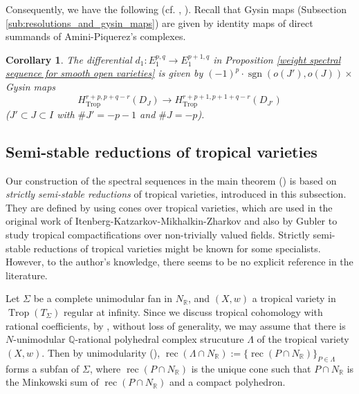 \documentclass[12pt,a4]{amsart}
\newtheorem{cor}[thm]{Corollary}
\def\R{\mathbb{R}}
\def\Q{\mathbb{Q}}
\def\rec{\mathop{\mathrm{rec}}\nolimits}
\def\sgn{\mathop{\mathrm{sgn}}\nolimits}
\def\Trop{\mathop{\mathrm{trop}}\nolimits}
\def\Trop{\mathop{\mathrm{Trop}}\nolimits}
\numberwithin{equation}{section}
\numberwithin{figure}{section}
\begin{document}
     Consequently, we have the following (cf. 
      \cite[Proposition 1.8]{GuillenNavarroSurlethormelocaldescyclesinvariantsAznar1990},  
   \cite[Proposition 4.7 and 4.10]{PetersSteenbrinkMixedHodgestructures2008}).
   Recall that 
   Gysin maps 
   (Subsection \ref{sub:resolutions_and_gysin_maps})
   are given by identity maps of direct summands of Amini-Piquerez's complexes.

  \begin{cor}\label{sign of log spectral sequence:label}
   The differential 
   $d_1 \colon E_1^{p,q} \to E_1^{p+1,q}$
   in Proposition \ref{weight spectral sequence for smooth open varieties}
   is given by   $  (-1)^{p} \cdot  \sgn (o(J'), o(J)) \times $ Gysin maps
    $$  H^{r+p, p+q -r}_{\Trop} ( D_J ) 
          \to 
          H^{r+p+1, p+1+q -r }_{\Trop} ( D_{J'} ) $$
    ($J' \subset J \subset I $ 
       with $ \# J'= -p-1$ and $ \# J= -p$). 
  \end{cor}



 \subsection{Semi-stable reductions of tropical varieties}
  \label{sub:semi_stable_reductions_of_tropical_varieties}
  Our construction of the spectral sequences in the main theorem ()
  is based on \emph{strictly semi-stable reductions} of tropical varieties, introduced in this subsection. 
   They are defined by using cones over tropical varieties, 
   which are used 
   in the original work of  Itenberg-Katzarkov-Mikhalkin-Zharkov \cite{ItenbergKatzarkovMikhalkinZharkovTropicalhomology2019} 
   and also by Gubler to study
     tropical compactifications over non-trivially valued fields.
  Strictly semi-stable reductions of tropical varieties might be known for some specialists.
    However, to the author's knowledge, there seems to be no explicit reference in the literature. 

  Let $\Sigma$ be a complete unimodular fan in $N_\R$,
  and $(X,w) $
    a tropical variety in $ \Trop (T_{\Sigma})$ regular at infinity. 
  Since we discuss tropical cohomology 
    with rational coefficients, 
   by  , 
   without loss of generality, 
   we may assume that there is 
   $N$-unimodular
    $\Q$-rational 
    polyhedral complex strucuture $\Lambda$ 
    of the tropical variety $(X,w)$.
    Then by unimodularity (), $\rec ( \Lambda \cap N_\R ):= \{ \rec (P \cap N_\R  ) \}_{P \in \Lambda }$ forms a subfan of $\Sigma$,
   where $\rec(P \cap N_\R )$ is the unique cone such that 
       $P  \cap N_\R  $ is the Minkowski sum of 
        $\rec(P \cap N_\R )$ and a compact polyhedron.
\end{document}
